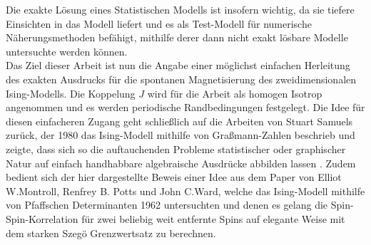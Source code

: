 \noindent 
Die exakte Lösung eines Statistischen Modells ist insofern wichtig, da sie tiefere Einsichten in das Modell liefert und es als Test-Modell für numerische Näherungsmethoden befähigt, mithilfe derer dann nicht exakt lösbare Modelle untersuchte werden können.\\
Das Ziel dieser Arbeit ist nun die Angabe einer möglichst einfachen Herleitung des exakten Ausdrucks für die spontanen Magnetisierung des zweidimensionalen Ising-Modells. Die Koppelung $J$ wird für die Arbeit als homogen Isotrop angenommen und es werden periodische Randbedingungen festgelegt. Die Idee für diesen einfacheren Zugang geht schließlich auf die Arbeiten von Stuart Samuels zurück, der 1980 das Ising-Modell mithilfe von Graßmann-Zahlen beschrieb und zeigte, dass sich so die auftauchenden Probleme statistischer oder graphischer Natur auf einfach handhabbare algebraische Ausdrücke abbilden lassen \cite{StuartSamuel1} \cite{StuartSamuel2}. Zudem bedient sich der hier dargestellte Beweis einer Idee aus dem Paper \cite{Montroll_Potts_Ward} von Elliot W.Montroll, Renfrey B. Potts und John C.Ward, welche das Ising-Modell mithilfe von Pfaffschen Determinanten 1962 untersuchten und denen es gelang die Spin-Spin-Korrelation für zwei beliebig weit entfernte Spins auf elegante Weise mit dem starken Szegö Grenzwertsatz zu berechnen. 

